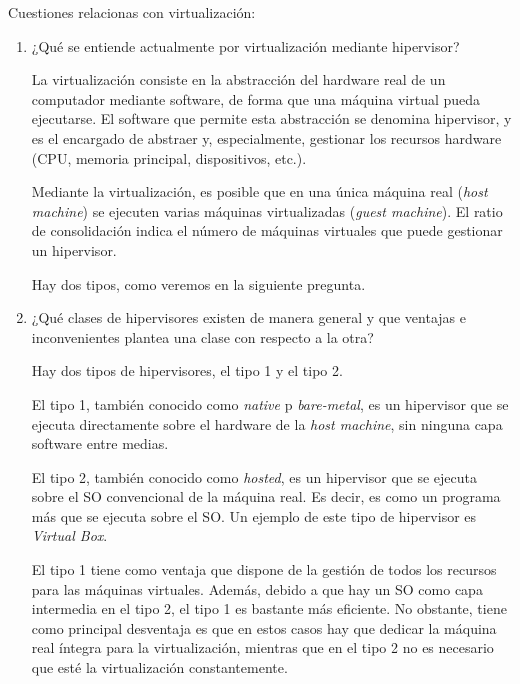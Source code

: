\begin{ejercicio}
    Cuestiones relacionas con virtualización:
    \begin{enumerate}
        \item ¿Qué se entiende actualmente por virtualización mediante hipervisor?

        La virtualización consiste en la abstracción del hardware real de un computador mediante software, de forma que una máquina virtual pueda ejecutarse. El software que permite esta abstracción se denomina hipervisor, y es el encargado de abstraer y, especialmente, gestionar los recursos hardware (CPU, memoria principal, dispositivos, etc.).

        Mediante la virtualización, es posible que en una única máquina real (\emph{host machine}) se ejecuten varias máquinas virtualizadas (\emph{guest machine}). El ratio de consolidación indica el número de máquinas virtuales que puede gestionar un hipervisor.

        Hay dos tipos, como veremos en la siguiente pregunta.
        
        \item ¿Qué clases de hipervisores existen de manera general y que ventajas e inconvenientes plantea una clase con respecto a la otra?

        Hay dos tipos de hipervisores, el tipo 1 y el tipo 2.

        El tipo 1, también conocido como \emph{native} p \emph{bare-metal}, es un hipervisor que se ejecuta directamente sobre el hardware de la \emph{host machine}, sin ninguna capa software entre medias.

        El tipo 2, también conocido como \emph{hosted}, es un hipervisor que se ejecuta sobre el SO convencional de la máquina real. Es decir, es como un programa más que se ejecuta sobre el SO. Un ejemplo de este tipo de hipervisor es \emph{Virtual Box}.

        El tipo 1 tiene como ventaja que dispone de la gestión de todos los recursos para las máquinas virtuales. Además, debido a que hay un SO como capa intermedia en el tipo 2, el tipo 1 es bastante más eficiente. No obstante, tiene como principal desventaja es que en estos casos hay que dedicar la máquina real íntegra para la virtualización, mientras que en el tipo 2 no es necesario que esté la virtualización constantemente.
    \end{enumerate}
\end{ejercicio}


